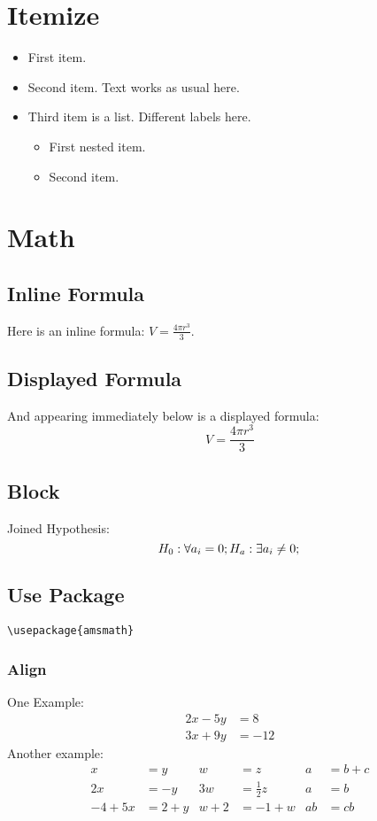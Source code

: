 \documentclass[12pt]{article}
\begin{document}
\section{Itemize}

\begin{itemize}
	\item First item.
	\item Second item. Text works as usual here.
	\item Third item is a list. Different labels here.
	\begin{itemize}
		\item First nested item.
		\item Second item.
	\end{itemize}
\end{itemize}




\section{Math}

\subsection{Inline Formula}
Here is an inline formula:
$   V = \frac{4 \pi r^3}{3}  $.

\subsection{Displayed Formula}
And appearing immediately below
is a displayed formula:
$$  V = \frac{4 \pi r^3}{3}  $$

\subsection{Block}
Joined Hypothesis:
\begin{equation}
H_0:\forall a_i=0;\\
H_a: \exists a_i \neq 0;\\
\end{equation}

\subsection{Use Package}
\verb|\usepackage{amsmath}|
\subsubsection{Align}
One Example:
\begin{align*} 
2x - 5y &=  8 \\ 
3x + 9y &=  -12
\end{align*}
Another example:
\begin{align*}
x&=y           &  w &=z              &  a&=b+c\\
2x&=-y         &  3w&=\frac{1}{2}z   &  a&=b\\
-4 + 5x&=2+y   &  w+2&=-1+w          &  ab&=cb
\end{align*}
\end{document}
